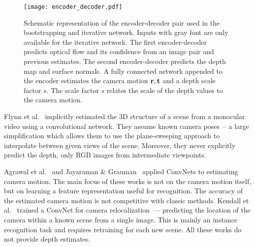\documentclass[10pt,twocolumn,letterpaper]{article}
\begin{document}
\begin{figure*}
\begin{center}
\texttt{[image: encoder\_decoder.pdf]}
\end{center}
\vspace{-0.8em}%
\vspace{\capvspace}%
\caption{%
Schematic representation of the encoder-decoder pair used in the bootstrapping and iterative network.
Inputs with gray font are only available for the iterative network.
The first encoder-decoder predicts optical flow and its confidence from an image pair and previous estimates.
The second encoder-decoder predicts the depth map and surface normals. A fully connected network appended to the encoder estimates the camera motion $\mathbf{r}, \mathbf{t}$ and a depth scale factor $s$.
The scale factor $s$ relates the scale of the depth values to the camera motion.
}
\label{fig:encoder_decoder_pair}
\vspace{\figvspace}
\end{figure*}

Flynn et al.~\cite{flynn_deepstereo_2015} implicitly estimated the 3D structure of a scene from a monocular video using a convolutional network.
They assume known camera poses~-- a large simplification which allows them to use the plane-sweeping approach to interpolate between given views of the scene.
Moreover, they never explicitly predict the depth, only RGB images from intermediate viewpoints.

Agrawal et al.~\cite{agrawal_egomotion_2015} and Jayaraman \& Grauman~\cite{Jayaraman2015egomotion} applied ConvNets to estimating camera motion. The main focus of these works is not on the camera motion itself, but on learning a feature representation useful for recognition. The accuracy of the estimated camera motion is not competitive with classic methods. 
Kendall et al.~\cite{kendall_modelling_2015} trained a ConvNet for camera relocalization~--- predicting the location of the camera within a known scene from a single image.
This is mainly an instance recognition task and requires retraining for each new scene. 
All these works do not provide depth estimates. 
\end{document}
